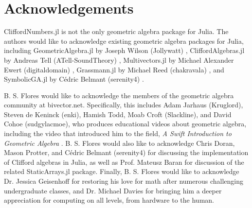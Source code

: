 \documentclass{juliacon}
\begin{document}
\section{Acknowledgements}

CliffordNumbers.jl is not the only geometric algebra package for Julia.
The authors would like to acknowledge existing geometric algebra packages for Julia, including GeometricAlgebra.jl by Joseph Wilson (Jollywatt) \cite{GeometricAlgebra.jl}, CliffordAlgebras.jl by Andreas Tell (ATell-SoundTheory) \cite{CliffordAlgebras.jl}, Multivectors.jl by Michael Alexander Ewert (digitaldomain) \cite{Multivectors.jl}, Grassmann.jl by Michael Reed (chakravala) \cite{Grassmann.jl}, and SymbolicGA.jl by Cédric Belmant (serenity4) \cite{SymbolicGA.jl}.

B. S. Flores would like to acknowledge the members of the geometric algebra community at bivector.net.
Specifically, this includes Adam Jarhaus (Kruglord), Steven de Keninck (enki), Hamish Todd, Moab Croft (Slackline), and David Cohoe (sudgylacmoe), who produces educational videos about geometric algebra, including the video that introduced him to the field, \textit{A Swift Introduction to Geometric Algebra} \cite{swift-intro}.
B. S. Flores would also like to acknowledge Chris Doran, Mason Protter, and Cédric Belmant (serenity4) for discussing the implementation of Clifford algebras in Julia, as well as Prof. Mateusz Baran for discussion of the related StaticArrays.jl package.
Finally, B. S. Flores would like to acknowledge Dr. Jessica Geisenhoff for restoring his love for math after numerous challenging undergraduate classes, and Dr. Michael Davies for bringing him a deeper appreciation for computing on all levels, from hardware to the human.


\end{document}
